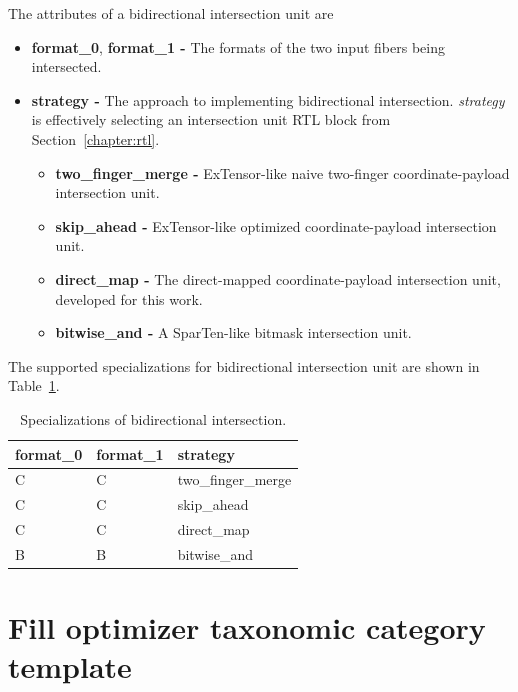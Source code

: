 The attributes of a bidirectional intersection unit are

\begin{itemize}
    \item \textbf{format\_0}, \textbf{format\_1 -} The formats of the two input fibers being intersected.
    \item \textbf{strategy -} The approach to implementing bidirectional intersection. \textit{strategy} is effectively selecting an intersection unit RTL block from Section~\ref{chapter:rtl}.
    \begin{itemize}
        \item \textbf{two\_finger\_merge -} ExTensor-like\cite{extensor} naive two-finger coordinate-payload intersection unit.
        \item \textbf{skip\_ahead -} ExTensor-like\cite{extensor} optimized coordinate-payload intersection unit.
        \item \textbf{direct\_map -} The direct-mapped coordinate-payload intersection unit, developed for this work.
        \item \textbf{bitwise\_and -} A SparTen-like\cite{sparten} bitmask intersection unit.
    \end{itemize}
\end{itemize}

The supported specializations for bidirectional intersection unit are shown in Table~\ref{tab:IntersectionBidirectional_specializations}.

\begin{table}[H]
\centering
\begin{tabular}{lll}
\toprule
 format\_0   & format\_1   & strategy         \\
\midrule
 C          & C          & two\_finger\_merge \\
 C          & C          & skip\_ahead       \\
 C          & C          & direct\_map       \\
 B          & B          & bitwise\_and      \\
\bottomrule
\end{tabular}
\caption{Specializations of bidirectional intersection.}
\label{tab:IntersectionBidirectional_specializations}
\end{table}

\section{Fill optimizer taxonomic category template}

